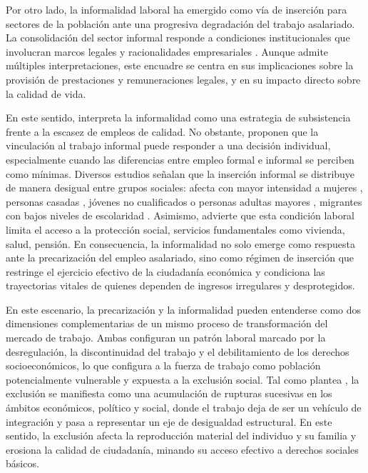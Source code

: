 \documentclass[
  spanish,
  11pt,
  a4paper,
]{scrbook}
\begin{document}
Por otro lado, la informalidad laboral ha emergido como vía de inserción
para sectores de la población ante una progresiva degradación del
trabajo asalariado. La consolidación del sector informal responde a
condiciones institucionales que involucran marcos legales y
racionalidades empresariales \autocite{Loayza2009}. Aunque admite
múltiples interpretaciones, este encuadre se centra en sus implicaciones
sobre la provisión de prestaciones y remuneraciones legales, y en su
impacto directo sobre la calidad de vida.

En este sentido, \textcite{Tokman2001} interpreta la informalidad como
una estrategia de subsistencia frente a la escasez de empleos de
calidad. No obstante, \textcite{Marinescu2020} proponen que la
vinculación al trabajo informal puede responder a una decisión
individual, especialmente cuando las diferencias entre empleo formal e
informal se perciben como mínimas. Diversos estudios señalan que la
inserción informal se distribuye de manera desigual entre grupos
sociales: afecta con mayor intensidad a mujeres \autocite{Sanchez2022},
personas casadas \autocite{Huesca2012}, jóvenes no cualificados o
personas adultas mayores \autocite{Marinescu2020}, migrantes con bajos
niveles de escolaridad \autocite{Lara2020b}. Asimismo,
\textcite{Lopez2017} advierte que esta condición laboral limita el
acceso a la protección social, servicios fundamentales como vivienda,
salud, pensión. En consecuencia, la informalidad no solo emerge como
respuesta ante la precarización del empleo asalariado, sino como régimen
de inserción que restringe el ejercicio efectivo de la ciudadanía
económica y condiciona las trayectorias vitales de quienes dependen de
ingresos irregulares y desprotegidos.

En este escenario, la precarización y la informalidad pueden entenderse
como dos dimensiones complementarias de un mismo proceso de
transformación del mercado de trabajo. Ambas configuran un patrón
laboral marcado por la desregulación, la discontinuidad del trabajo y el
debilitamiento de los derechos socioeconómicos, lo que configura a la
fuerza de trabajo como población potencialmente vulnerable y expuesta a
la exclusión social. Tal como plantea \textcite{Rizo2006}, la exclusión
se manifiesta como una acumulación de rupturas sucesivas en los ámbitos
económicos, político y social, donde el trabajo deja de ser un vehículo
de integración y pasa a representar un eje de desigualdad estructural.
En este sentido, la exclusión afecta la reproducción material del
individuo y su familia y erosiona la calidad de ciudadanía, minando su
acceso efectivo a derechos sociales básicos.
\end{document}
